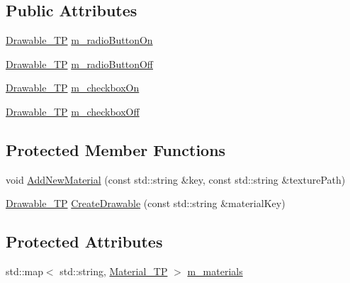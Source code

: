 \subsection*{Public Attributes}
\begin{DoxyCompactItemize}
\item 
\mbox{\hyperlink{classngl__gui_1_1_theme_a43741a39898ef4b14443b980a2e6d67c}{Drawable\+\_\+\+TP}} \mbox{\hyperlink{classngl__gui_1_1_theme_a604c0933d4676666dc312f0a108267e5}{m\+\_\+radio\+Button\+On}}
\item 
\mbox{\hyperlink{classngl__gui_1_1_theme_a43741a39898ef4b14443b980a2e6d67c}{Drawable\+\_\+\+TP}} \mbox{\hyperlink{classngl__gui_1_1_theme_a90a227c59aeb62fd64aaed7427911d95}{m\+\_\+radio\+Button\+Off}}
\item 
\mbox{\hyperlink{classngl__gui_1_1_theme_a43741a39898ef4b14443b980a2e6d67c}{Drawable\+\_\+\+TP}} \mbox{\hyperlink{classngl__gui_1_1_theme_a84f594991535796bf6f33a8bb91b1b26}{m\+\_\+checkbox\+On}}
\item 
\mbox{\hyperlink{classngl__gui_1_1_theme_a43741a39898ef4b14443b980a2e6d67c}{Drawable\+\_\+\+TP}} \mbox{\hyperlink{classngl__gui_1_1_theme_a684d50f27d853f91c17f6b2ba4b23614}{m\+\_\+checkbox\+Off}}
\end{DoxyCompactItemize}
\subsection*{Protected Member Functions}
\begin{DoxyCompactItemize}
\item 
void \mbox{\hyperlink{classngl__gui_1_1_theme_a6b46d8c368e7112e64e5ff764766b9f0}{Add\+New\+Material}} (const std\+::string \&key, const std\+::string \&texture\+Path)
\item 
\mbox{\hyperlink{classngl__gui_1_1_theme_a43741a39898ef4b14443b980a2e6d67c}{Drawable\+\_\+\+TP}} \mbox{\hyperlink{classngl__gui_1_1_theme_a6a425e30c7a2183edc9155f7821bec63}{Create\+Drawable}} (const std\+::string \&material\+Key)
\end{DoxyCompactItemize}
\subsection*{Protected Attributes}
\begin{DoxyCompactItemize}
\item 
std\+::map$<$ std\+::string, \mbox{\hyperlink{classngl__gui_1_1_theme_a036278e436de3fbf75bce9d5a6743b9b}{Material\+\_\+\+TP}} $>$ \mbox{\hyperlink{classngl__gui_1_1_theme_a63fc68b7dca52d444dcbecc0317ce038}{m\+\_\+materials}}
\end{DoxyCompactItemize}


